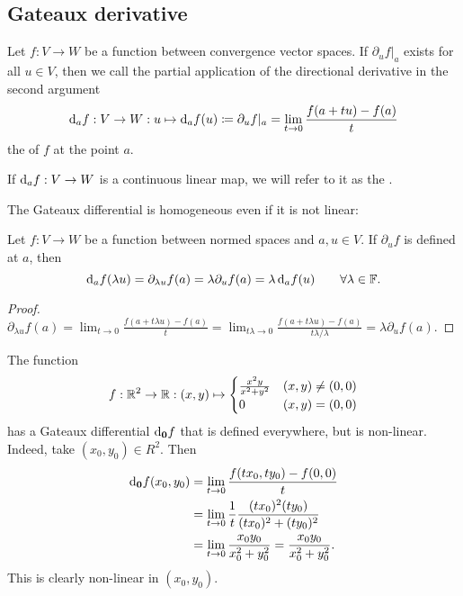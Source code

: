 \subsection{Gateaux derivative}
\begin{definition}
Let $f:V\to W$ be a function between convergence vector spaces. If $\partial_u f|_a$ exists for all $u\in V$, then we call the partial application of the directional derivative in the second argument
\[ \operatorname{d \!}{_af}: V\to W: u\mapsto \operatorname{d \!}{_af}(u) \coloneqq \partial_u f|_a = \lim_{t\to 0} \frac{f(a+tu) - f(a)}{t} \]
the  of $f$ at the point $a$.

If $\operatorname{d \!}{_af}: V\to W$ is a continuous linear map, we will refer to it as the .
\end{definition}
The Gateaux differential is homogeneous even if it is not linear:
\begin{lemma} \label{GateauxDifferentialHomogeneous}
Let $f:V\to W$ be a function between normed spaces and $a,u\in V$. If $\partial_u f$ is defined at $a$, then
\[ \operatorname{d \!}{_a f}(\lambda u) = \partial_{\lambda u}f(a) = \lambda\partial_u f(a) = \lambda \operatorname{d \!}{_a f}(u) \qquad \forall \lambda\in\mathbb{F}. \]
\end{lemma}
\begin{proof}
$\partial_{\lambda u}f(a) = \lim_{t\to 0} \frac{f(a+t\lambda u) - f(a)}{t} = \lim_{t\lambda\to 0} \frac{f(a+t\lambda u) - f(a)}{t \lambda / \lambda} = \lambda\partial_u f(a)$.
\end{proof}


\begin{example}
The function
\[ f: \mathbb{R}^2\to \mathbb{R}: (x,y) \mapsto \begin{cases}
\frac{x^2y}{x^2+y^2} & (x,y)\neq (0,0) \\0 & (x,y) = (0,0)
\end{cases} \]
has a Gateaux differential $\operatorname{d \!}{_{\boldsymbol{\mathrm{0}}}f}$ that is defined everywhere, but is non-linear.
Indeed, take $(x_0, y_0)\in R^2$. Then
\begin{align*}
\operatorname{d \!}{_{\boldsymbol{\mathrm{0}}}f}(x_0, y_0) &= \lim_{t\to 0}\frac{f(tx_0, ty_0) - f(0,0)}{t} \\
&= \lim_{t\to 0}\frac{1}{t}\frac{(tx_0)^2(ty_0)}{(tx_0)^2+(ty_0)^2} \\
&= \lim_{t\to 0}\frac{x_0y_0}{x_0^2+y_0^2} = \frac{x_0y_0}{x_0^2+y_0^2}.
\end{align*}
This is clearly non-linear in $(x_0, y_0)$.
\end{example}


